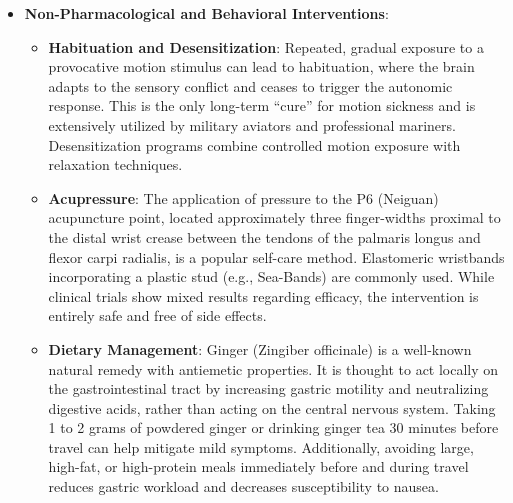 \begin{itemize}
\begin{itemize}
    \end{itemize}
    \item \textbf{Non-Pharmacological and Behavioral Interventions}:
    \begin{itemize}
        \item \textbf{Habituation and Desensitization}: Repeated, gradual exposure to a provocative motion stimulus can lead to habituation, where the brain adapts to the sensory conflict and ceases to trigger the autonomic response. This is the only long-term ``cure'' for motion sickness and is extensively utilized by military aviators and professional mariners. Desensitization programs combine controlled motion exposure with relaxation techniques.
        \item \textbf{Acupressure}: The application of pressure to the P6 (Neiguan) acupuncture point, located approximately three finger-widths proximal to the distal wrist crease between the tendons of the palmaris longus and flexor carpi radialis, is a popular self-care method. Elastomeric wristbands incorporating a plastic stud (e.g., Sea-Bands) are commonly used. While clinical trials show mixed results regarding efficacy, the intervention is entirely safe and free of side effects.
        \item \textbf{Dietary Management}: Ginger (Zingiber officinale) is a well-known natural remedy with antiemetic properties. It is thought to act locally on the gastrointestinal tract by increasing gastric motility and neutralizing digestive acids, rather than acting on the central nervous system. Taking 1 to 2 grams of powdered ginger or drinking ginger tea 30 minutes before travel can help mitigate mild symptoms. Additionally, avoiding large, high-fat, or high-protein meals immediately before and during travel reduces gastric workload and decreases susceptibility to nausea.
    \end{itemize}
\end{itemize}

